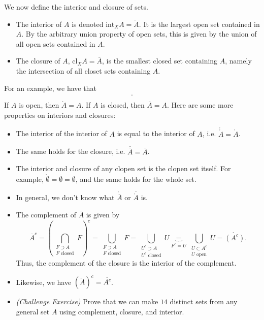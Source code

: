 \noindent We now define the interior and closure of sets.
\begin{itemize}
    \item The interior of $A$ is denoted $\mathrm{int}_X A = \mathring{A}$. It is the largest open set contained in $A$. By the arbitrary union property of open sets, this is given by the union of all open sets contained in $A$.
    \item The closure of $A$, $\mathrm{cl}_X A = \overline{A}$, is the smallest closed set containing $A$, namely the intersection of all closet sets containing $A$.
\end{itemize}
For an example, we have that
\begin{align*}
    [0, 1)^o &= (0, 1), \\
    \overline{[0, 1)} &= [0, 1]. \\
\end{align*}
If $A$ is open, then $\mathring{A} = A$. If $A$ is closed, then $\overline{A} = A$. Here are some more properties on interiors and closures:
\begin{itemize}
    \item The interior of the interior of $A$ is equal to the interior of $A$, i.e. $\mathring{\mathring{A}} = \mathring{A}$.
    \item The same holds for the closure, i.e. $\overline{\overline{A}} = \overline{A}$.
    \item The interior and closure of any clopen set is the clopen set itself. For example, $\mathring{\emptyset} = \overline{\emptyset} = \emptyset$, and the same holds for the whole set.
    \item In general, we don't know what $\mathring{\overline{A}}$ or $\overline{\mathring{A}}$ is.
    \item The complement of $\overline{A}$ is given by
    \[ \overline{A}^c = \left(\bigcap_{\substack{F \supset A \\ F \text{ closed}}} F \right)^c = \bigcup_{\substack{F \supset A \\ F \text{ closed}}} F = \bigcup_{\substack{U^c \supset A \\ U^c \text{ closed}}} U \underbrace{=}_{F^c = U} \bigcup_{\substack{U \subset A^c \\ U \text{ open}}} U = \mathring{(A^c)}. \]
    Thus, the complement of the closure is the interior of the complement.
    \item Likewise, we have $(\mathring{A})^c = \overline{A^c}$.
    \item \textit{(Challenge Exercise)} Prove that we can make $14$ distinct sets from any general set $A$ using complement, closure, and interior.
\end{itemize}


